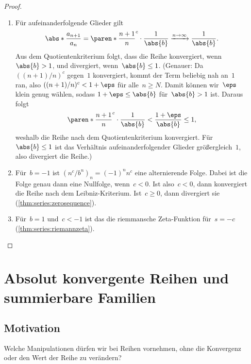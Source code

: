 \documentclass[a4paper]{article}
\begin{document}
\begin{proof}\leavevmode
    \begin{enumerate}
        \item Für aufeinanderfolgende Glieder gilt
              \begin{equation*}
                  \abs*{\frac{a_{n+1}}{a_n}} = \paren*{\frac{n+1}{n}}^c \cdot \frac{1}{\abs{b}} \xrightarrow{n\to\infty} \frac{1}{\abs{b}}.
              \end{equation*}
              Aus dem Quotientenkriterium folgt, dass die Reihe konvergiert, wenn~$\abs{b} > 1$, und divergiert, wenn~$\abs{b} \leq 1$. (Genauer: Da $((n+1)/n)^c$ gegen~$1$ konvergiert, kommt der Term beliebig nah an~$1$ ran, also $((n+1)/n)^c < 1+\eps$ für alle~$n \geq N$. Damit können wir~$\eps$ klein genug wählen, sodass $1+\eps \leq \abs{b}$ für~$\abs{b} > 1$ ist. Daraus folgt
              \begin{equation*}
                  \paren*{\frac{n+1}{n}}^c \cdot \frac{1}{\abs{b}} < \frac{1+\eps}{\abs{b}} \leq 1,
              \end{equation*}
              weshalb die Reihe nach dem Quotientenkriterium konvergiert. Für~$\abs{b} \leq 1$ ist das Verhältnis aufeinanderfolgender Glieder größergleich~$1$, also divergiert die Reihe.)
        \item Für~$b = -1$ ist $(n^c/b^n)_n = (-1)^n n^c$ eine alternierende Folge. Dabei ist die Folge genau dann eine Nullfolge, wenn~$c < 0$. Ist also~$c < 0$, dann konvergiert die Reihe nach dem Leibniz-Kriterium. Ist~$c \geq 0$, dann divergiert sie (\cref{thm:series:zerosequence}).
        \item Für~$b = 1$ und~$c < -1$ ist das die riemmansche Zeta-Funktion für~$s = -c$ (\cref{thm:series:riemannzeta}).\qedhere
    \end{enumerate}
\end{proof}

\section{Absolut konvergente Reihen und summierbare Familien}

\subsection{Motivation}

Welche Manipulationen dürfen wir bei Reihen vornehmen, ohne die Konvergenz oder den Wert der Reihe zu verändern?
\end{document}
